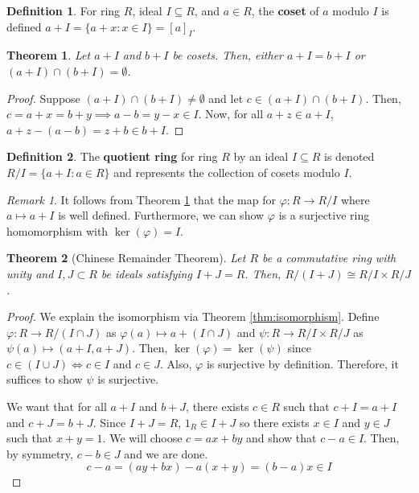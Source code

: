\documentclass[parskip=half]{scrartcl}  %
\theoremstyle{definition}
\newtheorem{definition}{Definition}[section]
\theoremstyle{plain}
\newtheorem{theorem}{Theorem}[definition]
\theoremstyle{remark}
\newtheorem{remark}{Remark}[definition]
\begin{document}
\begin{definition}
    For ring $R$, ideal $I\subseteq R$, and $a\in R$, the \textbf{coset} of $a$ modulo $I$ is
    defined $a+I=\{a+x:x\in I\}=[a]_I$.
\end{definition}

\begin{theorem}
    \label{thm:cosets disjoint}
    Let $a+I$ and $b+I$ be cosets.
    Then, either $a+I=b+I$ or $(a+I)\cap(b+I)=\emptyset$.
\end{theorem}

\begin{proof}
    Suppose $(a+I)\cap(b+I)\neq\emptyset$ and let $c\in(a+I)\cap(b+I)$.
    Then, $c=a+x=b+y\implies a-b=y-x\in I$.
    Now, for all $a+z\in a+I$, $a+z-(a-b)=z+b\in b+I$.
\end{proof}

\begin{definition}
    The \textbf{quotient ring} for ring $R$ by an ideal $I\subseteq R$ is denoted
    $R/I=\{a+I:a\in R\}$ and represents the collection of cosets modulo $I$.
\end{definition}

\begin{remark}
    It follows from Theorem \ref{thm:cosets disjoint} that the map for $\varphi:R\to R/I$ where
    $a\mapsto a+I$ is well defined.
    Furthermore, we can show $\varphi$ is a surjective ring homomorphism with $\ker(\varphi)=I$.
\end{remark}

\begin{theorem}[Chinese Remainder Theorem]
    Let $R$ be a commutative ring with unity and $I,J\subset R$ be ideals satisfying $I+J=R$.
    Then, $R/(I+J)\cong R/I\times R/J$.
\end{theorem}

\begin{proof}
    We explain the isomorphism via Theorem \ref{thm:isomorphism}.
    Define $\varphi:R\to R/(I\cap J)$ as $\varphi(a)\mapsto a+(I\cap J)$ and
    $\psi:R\to R/I\times R/J$ as $\psi(a)\mapsto(a+I,a+J)$.
    Then, $\ker(\varphi)=\ker(\psi)$ since $c\in(I\cup J)\iff c\in I$ and $c\in J$.
    Also, $\varphi$ is surjective by definition.
    Therefore, it suffices to show $\psi$ is surjective.

    We want that for all $a+I$ and $b+J$, there exists $c\in R$ such that $c+I=a+I$ and $c+J=b+J$.
    Since $I+J=R$, $1_R\in I+J$ so there exists $x\in I$ and $y\in J$ such that $x+y=1$.
    We will choose $c=ax+by$ and show that $c-a\in I$.
    Then, by symmetry, $c-b\in J$ and we are done.
    \[c-a=(ay+bx)-a(x+y)=(b-a)x\in I\]
\end{proof}
\end{document}
